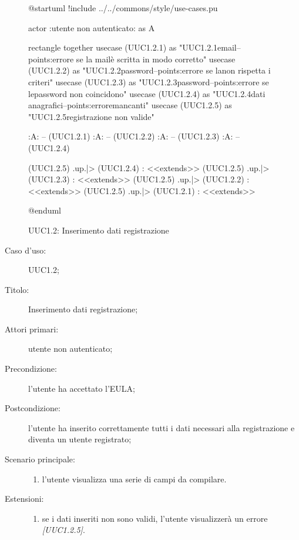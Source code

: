 \documentclass[components/casi-duso-app]{subfiles}
\begin{document}
\begin{figure}[H]
  \centering
  \begin{plantuml}
  @startuml
  !include ../../commons/style/use-cases.pu

  actor :utente non autenticato: as A

  rectangle {
    together {
      usecase (UUC1.2.1) as "UUC1.2.1\nRegistrazione email\n--\nExtension points:\nVisualizzazione errore se la mail\nnon è scritta in modo corretto"
      usecase (UUC1.2.2) as "UUC1.2.2\nRegistrazione password\n--\nExtension points:\nVisualizzazione errore se la\npassword non rispetta i criteri"
      usecase (UUC1.2.3) as "UUC1.2.3\nConferma password\n--\nExtension points:\nVisualizzazione errore se le\ndue password non coincidono"
      usecase (UUC1.2.4) as "UUC1.2.4\nInserimento dati anagrafici\n--\nExtension points:\nVisualizzazione errore\ndati mancanti"
      usecase (UUC1.2.5) as "UUC1.2.5\nInformazioni registrazione non valide"
    }
  }

  :A: -- (UUC1.2.1)
  :A: -- (UUC1.2.2)
  :A: -- (UUC1.2.3)
  :A: -- (UUC1.2.4)

  (UUC1.2.5) .up.|> (UUC1.2.4) : <<extends>>
  (UUC1.2.5) .up.|> (UUC1.2.3) : <<extends>>
  (UUC1.2.5) .up.|> (UUC1.2.2) : <<extends>>
  (UUC1.2.5) .up.|> (UUC1.2.1) : <<extends>>

  @enduml
  \end{plantuml}
  \caption{UUC1.2: Inserimento dati registrazione}%
  \label{fig:uuc1_2}
\end{figure}

\begin{description}
  \item[Caso d’uso:] UUC1.2;
  \item[Titolo:] Inserimento dati registrazione;
  \item[Attori primari:] utente non autenticato;
  \item[Precondizione:] l'utente ha accettato l'EULA;
  \item[Postcondizione:] l'utente ha inserito correttamente tutti i dati necessari alla registrazione e diventa un utente registrato;
  \item[Scenario principale:]
  \begin{enumerate}
    \item l'utente visualizza una serie di campi da compilare.
  \end{enumerate}
  \item[Estensioni:]
  \begin{enumerate}
    \item se i dati inseriti non sono validi, l'utente visualizzerà un errore \emph{[UUC1.2.5]}.
  \end{enumerate}
\end{description}
\end{document}
